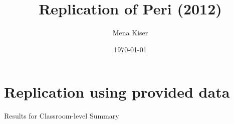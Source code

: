 \documentclass{article}
\title{Replication of Peri (2012)}
\author{Mena Kiser}
\date{\today}
\begin{document}
\maketitle

\section{Replication using provided data}

\begin{table}[h]
\centering
\caption{Results for Classroom-level Summary}
\end{table}
\end{document}
